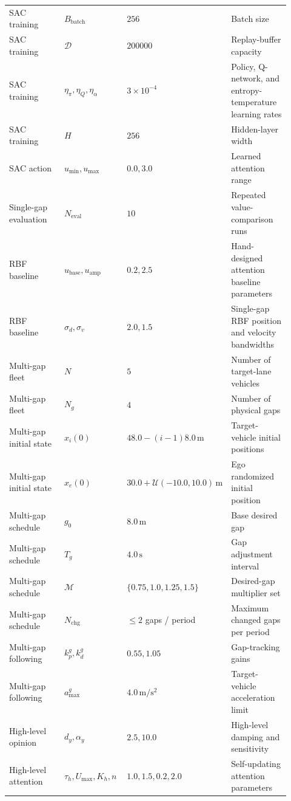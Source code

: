 \begin{uomappendix}
{\begin{supertabular}{L{0.23\linewidth}L{0.23\linewidth}L{0.23\linewidth}L{0.23\linewidth}}
SAC training & \(B_{\mathrm{batch}}\) & \(256\) & Batch size \\
SAC training & \(\mathcal{D}\) & \(200000\) & Replay-buffer capacity \\
SAC training & \(\eta_{\pi},\eta_Q,\eta_{\alpha}\) & \(3\times10^{-4}\) & Policy, Q-network, and entropy-temperature learning rates \\
SAC training & \(H\) & \(256\) & Hidden-layer width \\
SAC action & \(u_{\min},u_{\max}\) & \(0.0,3.0\) & Learned attention range \\
Single-gap evaluation & \(N_{\mathrm{eval}}\) & \(10\) & Repeated value-comparison runs \\
RBF baseline & \(u_{\mathrm{base}},u_{\mathrm{amp}}\) & \(0.2,2.5\) & Hand-designed attention baseline parameters \\
RBF baseline & \(\sigma_d,\sigma_v\) & \(2.0,1.5\) & Single-gap RBF position and velocity bandwidths \\
Multi-gap fleet & \(N\) & \(5\) & Number of target-lane vehicles \\
Multi-gap fleet & \(N_g\) & \(4\) & Number of physical gaps \\
Multi-gap initial state & \(x_i(0)\) & \(48.0-(i-1)8.0\,\mathrm{m}\) & Target-vehicle initial positions \\
Multi-gap initial state & \(x_e(0)\) & \(30.0+\mathcal{U}(-10.0,10.0)\,\mathrm{m}\) & Ego randomized initial position \\
Multi-gap schedule & \(g_0\) & \(8.0\,\mathrm{m}\) & Base desired gap \\
Multi-gap schedule & \(T_g\) & \(4.0\,\mathrm{s}\) & Gap adjustment interval \\
Multi-gap schedule & \(\mathcal{M}\) & \(\{0.75,1.0,1.25,1.5\}\) & Desired-gap multiplier set \\
Multi-gap schedule & \(N_{\mathrm{chg}}\) & \(\leq2\) gaps / period & Maximum changed gaps per period \\
Multi-gap following & \(k_p^g,k_d^g\) & \(0.55,1.05\) & Gap-tracking gains \\
Multi-gap following & \(a_{\max}^g\) & \(4.0\,\mathrm{m / s^2}\) & Target-vehicle acceleration limit \\
High-level opinion & \(d_y,\alpha_y\) & \(2.5,10.0\) & High-level damping and sensitivity \\
High-level attention & \(\tau_h,U_{\max},K_h,n\) & \(1.0,1.5,0.2,2.0\) & Self-updating attention parameters \\

\end{supertabular}}
\end{uomappendix}
